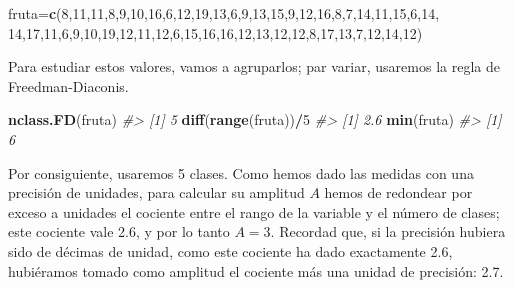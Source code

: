\documentclass[
]{book}
\newenvironment{Shaded}{\begin{snugshade}}{\end{snugshade}}
\newcommand{\CommentTok}[1]{\textcolor[rgb]{0.56,0.35,0.01}{\textit{#1}}}
\newcommand{\DecValTok}[1]{\textcolor[rgb]{0.00,0.00,0.81}{#1}}
\newcommand{\KeywordTok}[1]{\textcolor[rgb]{0.13,0.29,0.53}{\textbf{#1}}}
\newcommand{\NormalTok}[1]{#1}
\newcommand{\OperatorTok}[1]{\textcolor[rgb]{0.81,0.36,0.00}{\textbf{#1}}}
\theoremstyle{definition}
\theoremstyle{definition}
\theoremstyle{definition}
\theoremstyle{remark}
\begin{document}
\begin{Shaded}
\begin{Highlighting}[]
\NormalTok{fruta=}\KeywordTok{c}\NormalTok{(}\DecValTok{8}\NormalTok{,}\DecValTok{11}\NormalTok{,}\DecValTok{11}\NormalTok{,}\DecValTok{8}\NormalTok{,}\DecValTok{9}\NormalTok{,}\DecValTok{10}\NormalTok{,}\DecValTok{16}\NormalTok{,}\DecValTok{6}\NormalTok{,}\DecValTok{12}\NormalTok{,}\DecValTok{19}\NormalTok{,}\DecValTok{13}\NormalTok{,}\DecValTok{6}\NormalTok{,}\DecValTok{9}\NormalTok{,}\DecValTok{13}\NormalTok{,}\DecValTok{15}\NormalTok{,}\DecValTok{9}\NormalTok{,}\DecValTok{12}\NormalTok{,}\DecValTok{16}\NormalTok{,}\DecValTok{8}\NormalTok{,}\DecValTok{7}\NormalTok{,}\DecValTok{14}\NormalTok{,}\DecValTok{11}\NormalTok{,}\DecValTok{15}\NormalTok{,}\DecValTok{6}\NormalTok{,}\DecValTok{14}\NormalTok{,}
  \DecValTok{14}\NormalTok{,}\DecValTok{17}\NormalTok{,}\DecValTok{11}\NormalTok{,}\DecValTok{6}\NormalTok{,}\DecValTok{9}\NormalTok{,}\DecValTok{10}\NormalTok{,}\DecValTok{19}\NormalTok{,}\DecValTok{12}\NormalTok{,}\DecValTok{11}\NormalTok{,}\DecValTok{12}\NormalTok{,}\DecValTok{6}\NormalTok{,}\DecValTok{15}\NormalTok{,}\DecValTok{16}\NormalTok{,}\DecValTok{16}\NormalTok{,}\DecValTok{12}\NormalTok{,}\DecValTok{13}\NormalTok{,}\DecValTok{12}\NormalTok{,}\DecValTok{12}\NormalTok{,}\DecValTok{8}\NormalTok{,}\DecValTok{17}\NormalTok{,}\DecValTok{13}\NormalTok{,}\DecValTok{7}\NormalTok{,}\DecValTok{12}\NormalTok{,}\DecValTok{14}\NormalTok{,}\DecValTok{12}\NormalTok{)}
\end{Highlighting}
\end{Shaded}

Para estudiar estos valores, vamos a agruparlos; par variar, usaremos la regla de Freedman-Diaconis.

\begin{Shaded}
\begin{Highlighting}[]
\KeywordTok{nclass.FD}\NormalTok{(fruta)}
\CommentTok{\#\textgreater{} [1] 5}
\KeywordTok{diff}\NormalTok{(}\KeywordTok{range}\NormalTok{(fruta))}\OperatorTok{/}\DecValTok{5}
\CommentTok{\#\textgreater{} [1] 2.6}
\KeywordTok{min}\NormalTok{(fruta)}
\CommentTok{\#\textgreater{} [1] 6}
\end{Highlighting}
\end{Shaded}

Por consiguiente, usaremos 5 clases. Como hemos dado las medidas con una precisión de unidades,
para calcular su amplitud \(A\) hemos de redondear por exceso a unidades el cociente entre el rango de la variable y el número de clases; este cociente vale 2.6, y por lo tanto \(A=3\). Recordad que, si la precisión hubiera sido de décimas de unidad, como este cociente ha dado exactamente 2.6, hubiéramos tomado como amplitud el cociente más una unidad de precisión: 2.7.
\end{document}
